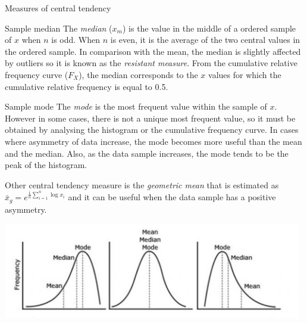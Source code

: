 \documentclass[8pt]{beamer}
\begin{document}
\begin{frame}{Measures of central tendency}
    \begin{block}{Sample median}
        The \emph{median} ($x_m$) is the value in the middle of a ordered sample of $x$ when $n$ is odd. When $n$ is even, it is the average of the two central values in the ordered sample. In comparison with the mean, the median is slightly affected by outliers so it is known as the \emph{resistant measure}. From the cumulative relative frequency curve ($F_X$), the median corresponds to the $x$ values for which the cumulative relative frequency is equal to 0.5.  
    \end{block}

    \begin{block}{Sample mode}
        The \emph{mode} is the most frequent value within the sample of $x$. However in some cases, there is not a unique most frequent value, so it must be obtained by analysing the histogram or the cumulative frequency curve. In cases where asymmetry of data increase, the mode becomes more useful than the mean and the median. Also, as the data sample increases, the mode tends to be the peak of the histogram.  
    \end{block}
    Other central tendency measure is the \emph{geometric mean} that is estimated as $\bar{x}_g = e^{\frac{1}{n} \sum_{i=1}^n \log x_i}$ and it can be useful when the data sample has a positive asymmetry. 

    \centering
    \includegraphics[width=0.98\textwidth]{fie3.JPG}
\end{frame}
\end{document}
